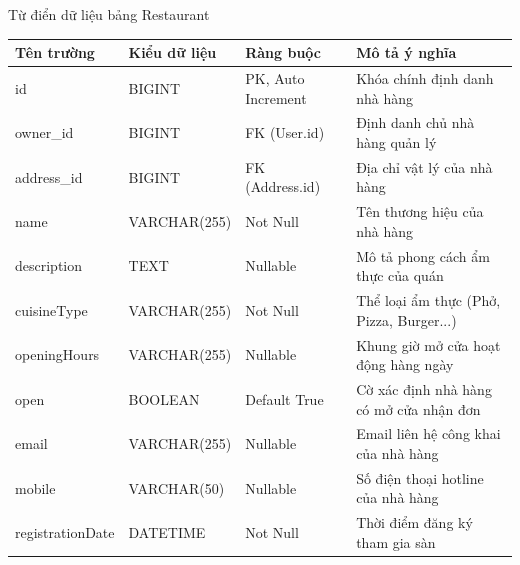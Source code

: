 \documentclass{uetgraduation}
\begin{document}
\begin{table}[!htbp]{Từ điển dữ liệu bảng Restaurant}
\centering
\small
\begin{tabularx}{\textwidth}{|>{\raggedright\arraybackslash}p{2.8cm}|>{\raggedright\arraybackslash}p{3.0cm}|>{\raggedright\arraybackslash}p{3.5cm}|>{\raggedright\arraybackslash}X|}
\hline
\textbf{Tên trường} & \textbf{Kiểu dữ liệu} & \textbf{Ràng buộc} & \textbf{Mô tả ý nghĩa} \\ \hline
id & BIGINT & PK, Auto Increment & Khóa chính định danh nhà hàng \\ \hline
owner\_id & BIGINT & FK (User.id) & Định danh chủ nhà hàng quản lý \\ \hline
address\_id & BIGINT & FK (Address.id) & Địa chỉ vật lý của nhà hàng \\ \hline
name & VARCHAR(255) & Not Null & Tên thương hiệu của nhà hàng \\ \hline
description & TEXT & Nullable & Mô tả phong cách ẩm thực của quán \\ \hline
cuisineType & VARCHAR(255) & Not Null & Thể loại ẩm thực (Phở, Pizza, Burger...) \\ \hline
openingHours & VARCHAR(255) & Nullable & Khung giờ mở cửa hoạt động hàng ngày \\ \hline
open & BOOLEAN & Default True & Cờ xác định nhà hàng có mở cửa nhận đơn \\ \hline
email & VARCHAR(255) & Nullable & Email liên hệ công khai của nhà hàng \\ \hline
mobile & VARCHAR(50) & Nullable & Số điện thoại hotline của nhà hàng \\ \hline
registrationDate & DATETIME & Not Null & Thời điểm đăng ký tham gia sàn \\ \hline
\end{tabularx}
\end{table}
\clearpage
\end{document}
